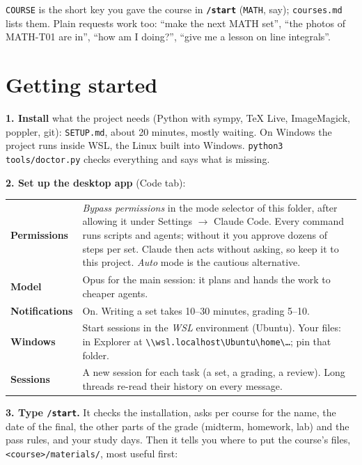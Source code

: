 \documentclass[a4paper,10pt]{article}
\newcommand{\cmd}[1]{\texttt{\bfseries #1}}
\newcommand{\argx}[1]{\texttt{\color{accent}#1}}
\begin{document}
\argx{COURSE} is the short key you gave the course in \cmd{/start} (\texttt{MATH}, say);
\texttt{courses.md} lists them. Plain requests work too: ``make the next MATH set'', ``the
photos of MATH-T01 are in'', ``how am I doing?'', ``give me a lesson on line integrals''.

\section{Getting started}

\textbf{1. Install} what the project needs (Python with sympy, TeX Live, ImageMagick,
poppler, git): \texttt{SETUP.md}, about 20 minutes, mostly waiting. On Windows the
project runs inside WSL, the Linux built into Windows. \texttt{python3 tools/doctor.py}
checks everything and says what is missing.

\textbf{2. Set up the desktop app} (Code tab):

\begin{tabularx}{\linewidth}{@{}>{\bfseries}l >{\raggedright\arraybackslash}X@{}}
\toprule
Permissions & \emph{Bypass permissions} in the mode selector of this folder, after allowing it
  under Settings $\rightarrow$ Claude Code. Every command runs scripts and agents; without it you
  approve dozens of steps per set. Claude then acts without asking, so keep it to this project.
  \emph{Auto} mode is the cautious alternative. \\
Model & Opus for the main session: it plans and hands the work to cheaper agents. \\
Notifications & On. Writing a set takes 10--30 minutes, grading 5--10. \\
Windows & Start sessions in the \emph{WSL} environment (Ubuntu). Your files: in Explorer at
  \texttt{\textbackslash\textbackslash wsl.localhost\textbackslash Ubuntu\textbackslash home\textbackslash\dots};
  pin that folder. \\
Sessions & A new session for each task (a set, a grading, a review). Long threads re-read
  their history on every message. \\
\bottomrule
\end{tabularx}

\textbf{3. Type \cmd{/start}.} It checks the installation, asks per course for the name,
the date of the final, the other parts of the grade (midterm, homework, lab) and the pass
rules, and your study days. Then it tells you where to put the course's files,
\texttt{<course>/materials/}, most useful first:
\end{document}
